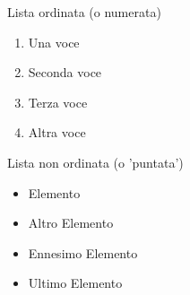 \documentclass{article}
\begin{document}
Lista ordinata (o numerata)
\begin{enumerate}
    \item Una voce
    \item Seconda voce
    \item Terza voce
    \item Altra voce
\end{enumerate}

Lista non ordinata (o 'puntata')
\begin{itemize}
    \item Elemento
    \item Altro Elemento
    \item Ennesimo Elemento
    \item Ultimo Elemento
\end{itemize}
\end{document}
